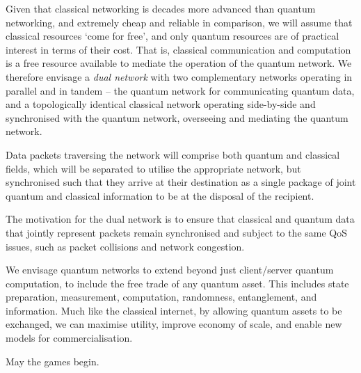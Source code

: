 Given that classical networking is decades more advanced than quantum networking, and extremely cheap and reliable in comparison, we will assume that classical resources `come for free', and only quantum resources are of practical interest in terms of their cost. That is, classical communication and computation is a free resource available to mediate the operation of the quantum network. We therefore envisage a \textit{dual network} with two complementary networks operating in parallel and in tandem -- the quantum network for communicating quantum data, and a topologically identical classical network operating side-by-side and synchronised with the quantum network, overseeing and mediating the quantum network.

Data packets traversing the network will comprise both quantum and classical fields, which will be separated to utilise the appropriate network, but synchronised such that they arrive at their destination as a single package of joint quantum and classical information to be at the disposal of the recipient.

The motivation for the dual network is to ensure that classical and quantum data that jointly represent packets remain synchronised and subject to the same QoS issues, such as packet collisions and network congestion.

We envisage quantum networks to extend beyond just client/server quantum computation, to include the free trade of any quantum asset. This includes state preparation, measurement, computation, randomness, entanglement, and information. Much like the classical internet, by allowing quantum assets to be exchanged, we can maximise utility, improve economy of scale, and enable new models for commercialisation.

May the games begin.